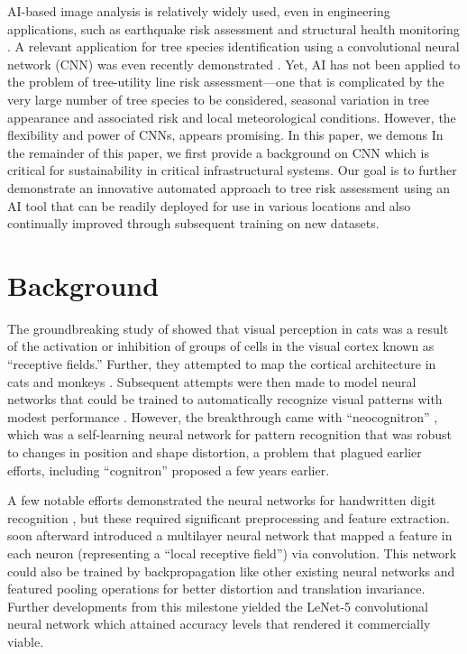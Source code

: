 \documentclass[11pt,twoside]{article}
\numberwithin{equation}{section}
\newcommand{\?}{\stackrel{?}{=}}
\begin{document}
AI-based image analysis is relatively widely used, even in engineering applications, such as earthquake risk assessment \cite{jiao2020artificial,salehi2018emerging} and structural health monitoring \cite{spencer2019advances}. A relevant application for tree species identification using a convolutional neural network (CNN) was even recently demonstrated \cite{fricker2019convolutional}. Yet, AI has not been applied to the problem of tree-utility line risk assessment---one that is complicated by the very large number of tree species to be considered, seasonal variation in tree appearance and associated risk and local meteorological conditions. However, the flexibility and power of CNNs, appears promising. In this paper, we demons In the remainder of this paper, we first provide a background on CNN which is critical for sustainability in critical infrastructural systems. Our goal is to further demonstrate an innovative automated approach to tree risk assessment using an AI tool that can be readily deployed for use in various locations and also continually improved through subsequent training on new datasets.


\section{Background}
The groundbreaking study of \citet{hubel1959receptive} showed that visual perception in cats was a result of the
activation or inhibition of groups of cells in the visual cortex known as ``receptive fields.''  Further, they attempted
to map the cortical architecture in cats and monkeys \cite{hubel1962receptive,hubel1965receptive,hubel1968receptive}.
Subsequent attempts were then made to model neural networks that could be trained to automatically recognize visual patterns with modest performance \cite{rosenblatt1962principles,kabrisky1966proposed,giebel1971feature,fukushima1975cognitron}. However, the breakthrough came with ``neocognitron'' \cite{fukushima1980neocognitron}, which
was a self-learning neural network for pattern recognition that was robust to changes in position and shape distortion, a problem that plagued earlier efforts, including ``cognitron'' \cite{fukushima1975cognitron} proposed a few years earlier.

A few notable efforts demonstrated the neural networks for handwritten digit recognition
\cite{fukushima1988neocognitron,denker1988neural}, but these required significant preprocessing and feature
extraction. \cite{lecun1989handwritten} soon afterward introduced a multilayer neural network that mapped a feature in each neuron (representing a ``local receptive field'') via convolution. This network could also be trained by backpropagation like other existing neural networks and featured pooling operations for better distortion and
translation invariance. Further developments from this milestone yielded the LeNet-5 convolutional neural network which attained accuracy levels that rendered it commercially viable.
\end{document}
